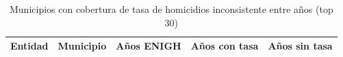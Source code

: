 \begin{table}[ht]
\centering
\caption{Municipios con cobertura de tasa de homicidios inconsistente entre años (top 30)} 
\label{tab:muni_M4_cobertura_parcial_anios}
\begin{tabular}{rrrrr}
  \toprule
Entidad & Municipio & Años ENIGH & Años con tasa & Años sin tasa \\ 
  \midrule
 \bottomrule
\end{tabular}
\end{table}
